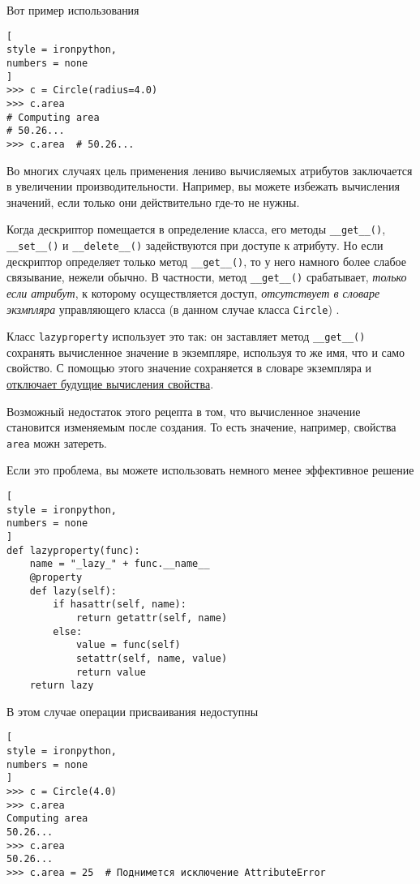 \documentclass[%
	11pt,
	a4paper,
	utf8,
		]{article}
\begin{document}
Вот пример использования
\begin{lstlisting}[
style = ironpython,
numbers = none
]
>>> c = Circle(radius=4.0)
>>> c.area
# Computing area
# 50.26...
>>> c.area  # 50.26...
\end{lstlisting}

Во многих случаях цель применения лениво вычисляемых атрибутов заключается в увеличении производительности. Например, вы можете избежать вычисления значений, если только они действительно где-то не нужны.

Когда дескриптор помещается в определение класса, его методы \verb|__get__()|, \verb|__set__()| и \verb|__delete__()| задействуются при доступе к атрибуту. Но если дескриптор определяет только метод \verb|__get__()|, то у него намного более слабое связывание, нежели обычно. В частности, метод \verb|__get__()| срабатывает, \emph{только если атрибут}, к которому осуществляется доступ, \emph{отсутствует в словаре экзмпляра} управляющего класса (в данном случае класса \texttt{Circle}) \cite[]{beazley:python_cookbook-2019}.

Класс \texttt{lazyproperty} использует это так: он заставляет метод \verb|__get__()| сохранять вычисленное значение в экземпляре, используя то же имя, что и само свойство. С помощью этого значение сохраняется в словаре экземпляра и \underline{отключает будущие вычисления свойства}.

Возможный недостаток этого рецепта в том, что вычисленное значение становится изменяемым после создания. То есть значение, например, свойства \texttt{area} можн затереть.

Если это проблема, вы можете использовать немного менее эффективное решение \cite[]{beazley:python_cookbook-2019}
\begin{lstlisting}[
style = ironpython,
numbers = none
]
def lazyproperty(func):
    name = "_lazy_" + func.__name__
    @property
    def lazy(self):
        if hasattr(self, name):
            return getattr(self, name)
        else:
            value = func(self)
            setattr(self, name, value)
            return value
    return lazy
\end{lstlisting}

В этом случае операции присваивания недоступны
\begin{lstlisting}[
style = ironpython,
numbers = none
]
>>> c = Circle(4.0)
>>> c.area
Computing area
50.26...
>>> c.area
50.26...
>>> c.area = 25  # Поднимется исключение AttributeError
\end{lstlisting}
\end{document}
